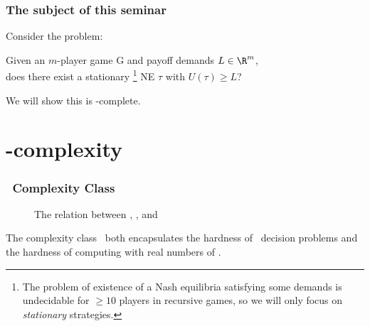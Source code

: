\documentclass[english, aspectratio=169]{beamer}
\begin{document}
\begin{frame}
  \frametitle{The subject of this seminar}

  Consider the problem:

  \vspace{10pt}
  
  \begin{center}
    Given an $m$-player game G and payoff demands $L \in \R^m$, \\
    does there exist a stationary \footnote{ The problem of existence of a Nash
      equilibria satisfying some demands is undecidable for $\geq 10$ players in
      recursive games, so we will only focus on \emph{stationary} strategies. }
    NE $\tau$ with $U(\tau) \geq L$?
  \end{center}

  We will show this is \cETR-complete.
\end{frame}

\section{\cETR-complexity}

\begin{frame}
  \frametitle{\cETR\ Complexity Class}
  \vspace{-25pt}
  \begin{figure}
    \centering

    
    \caption{The relation between \cNP, \cSqrtSum, and \cETR}
    \label{fig:complexity classes related}
  \end{figure}
   {
    \vspace{-15pt}
    The complexity class \cETR\ both encapsulates the hardness of \cNP\ decision
    problems and the hardness of computing with real numbers of \cSqrtSum.
  }
\end{frame}
\end{document}
